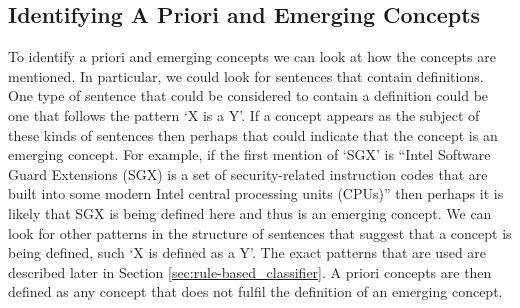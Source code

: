 \documentclass[12pt]{article}
\theoremstyle{grammarstyle}
\begin{document}

\subsection{Identifying A Priori and Emerging Concepts} \label{sec:classifying_concepts}
To identify a priori and emerging concepts we can look at how the concepts are mentioned.
In particular, we could look for sentences that contain definitions.
One type of sentence that could be considered to contain a definition could be one that follows the pattern `X is a Y'.
If a concept appears as the subject of these kinds of sentences then perhaps that could indicate that the concept is an emerging concept.
For example, if the first mention of `SGX' is ``Intel Software Guard Extensions (SGX) is a set of security-related instruction codes that are built into some modern Intel central processing units (CPUs)'' then perhaps it is likely that SGX is being defined here and thus is an emerging concept.
We can look for other patterns in the structure of sentences that suggest that a concept is being defined, such `X is defined as a Y'.
The exact patterns that are used are described later in Section \ref{sec:rule-based_classifier}.
A priori concepts are then defined as any concept that does not fulfil the definition of an emerging concept.

\end{document}
